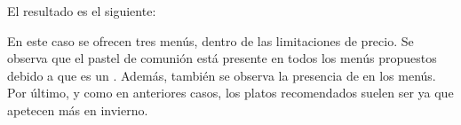 El resultado es el siguiente:


En este caso se ofrecen tres menús, dentro de las limitaciones de precio. Se observa que el pastel de comunión está presente en
todos los menús propuestos debido a que es un . Además, también se observa la presencia de
 en  los menús. Por último, y como en anteriores casos, los platos
recomendados suelen ser  ya que apetecen más en invierno.

